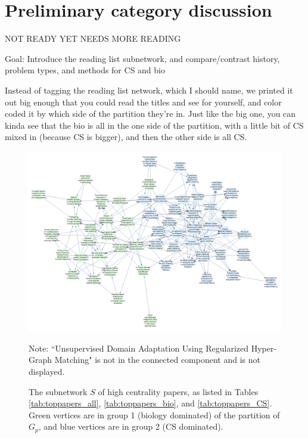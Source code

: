 \documentclass[12pt]{thesis}
\theoremstyle{plain}
\theoremstyle{definition}
\theoremstyle{remark}
\begin{document}
\section{Preliminary category discussion}

NOT READY YET NEEDS MORE READING

Goal: Introduce the reading list subnetwork, and compare/contrast history, problem types, and methods for CS and bio

Instead of tagging the reading list network, which I should name, we printed it out big enough that you could read the titles and see for yourself, and color coded it by which side of the partition they're in. Just like the big one, you can kinda see that the bio is all in the one side of the partition, with a little bit of CS mixed in (because CS is bigger), and then the other side is all CS.





\begin{figure}[h]
\centering
\includegraphics[width=\textwidth]{reading_list0pt9crop.png}
\caption{The subnetwork $S$ of high centrality papers, as listed in Tables \ref{tab:toppapers_all}, \ref{tab:toppapers_bio}, and \ref{tab:toppapers_CS}. Green vertices are in group 1 (biology dominated) of the partition of $G_p$, and blue vertices are in group 2 (CS dominated).}
\vspace{-12pt}\flushleft\scriptsize Note: ``Unsupervised Domain Adaptation Using Regularized Hyper-Graph Matching" is not in the connected component and is not displayed.
\label{fig:reading_list}
\end{figure}
\end{document}
